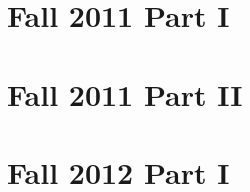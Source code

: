 \documentclass[10pt]{article}
\begin{document}
\tableofcontents
\clearpage

\newcommand{\sL}{\ensuremath{\mathscr L}}

\section{Fall 2011 Part I}

\clearpage

\section{Fall 2011 Part II}

\clearpage

\section{Fall 2012 Part I}

\clearpage
\end{document}

